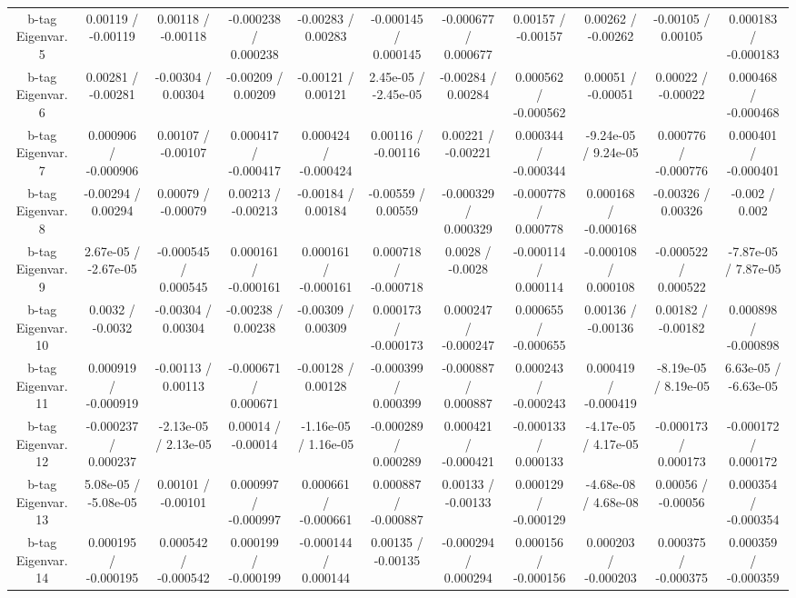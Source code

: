 {\begin{landscape}
\begin{longtable}{@{\extracolsep{\fill}}| *{11}{c|}}
  b-tag Eigenvar. 5 & 0.00119 / -0.00119 & 0.00118 / -0.00118 & -0.000238 / 0.000238 & -0.00283 / 0.00283 & -0.000145 / 0.000145 & -0.000677 / 0.000677 & 0.00157 / -0.00157 & 0.00262 / -0.00262 & -0.00105 / 0.00105 & 0.000183 / -0.000183 \\ 
  b-tag Eigenvar. 6 & 0.00281 / -0.00281 & -0.00304 / 0.00304 & -0.00209 / 0.00209 & -0.00121 / 0.00121 & 2.45e-05 / -2.45e-05 & -0.00284 / 0.00284 & 0.000562 / -0.000562 & 0.00051 / -0.00051 & 0.00022 / -0.00022 & 0.000468 / -0.000468 \\ 
  b-tag Eigenvar. 7 & 0.000906 / -0.000906 & 0.00107 / -0.00107 & 0.000417 / -0.000417 & 0.000424 / -0.000424 & 0.00116 / -0.00116 & 0.00221 / -0.00221 & 0.000344 / -0.000344 & -9.24e-05 / 9.24e-05 & 0.000776 / -0.000776 & 0.000401 / -0.000401 \\ 
  b-tag Eigenvar. 8 & -0.00294 / 0.00294 & 0.00079 / -0.00079 & 0.00213 / -0.00213 & -0.00184 / 0.00184 & -0.00559 / 0.00559 & -0.000329 / 0.000329 & -0.000778 / 0.000778 & 0.000168 / -0.000168 & -0.00326 / 0.00326 & -0.002 / 0.002 \\ 
  b-tag Eigenvar. 9 & 2.67e-05 / -2.67e-05 & -0.000545 / 0.000545 & 0.000161 / -0.000161 & 0.000161 / -0.000161 & 0.000718 / -0.000718 & 0.0028 / -0.0028 & -0.000114 / 0.000114 & -0.000108 / 0.000108 & -0.000522 / 0.000522 & -7.87e-05 / 7.87e-05 \\ 
  b-tag Eigenvar. 10 & 0.0032 / -0.0032 & -0.00304 / 0.00304 & -0.00238 / 0.00238 & -0.00309 / 0.00309 & 0.000173 / -0.000173 & 0.000247 / -0.000247 & 0.000655 / -0.000655 & 0.00136 / -0.00136 & 0.00182 / -0.00182 & 0.000898 / -0.000898 \\ 
  b-tag Eigenvar. 11 & 0.000919 / -0.000919 & -0.00113 / 0.00113 & -0.000671 / 0.000671 & -0.00128 / 0.00128 & -0.000399 / 0.000399 & -0.000887 / 0.000887 & 0.000243 / -0.000243 & 0.000419 / -0.000419 & -8.19e-05 / 8.19e-05 & 6.63e-05 / -6.63e-05 \\ 
  b-tag Eigenvar. 12 & -0.000237 / 0.000237 & -2.13e-05 / 2.13e-05 & 0.00014 / -0.00014 & -1.16e-05 / 1.16e-05 & -0.000289 / 0.000289 & 0.000421 / -0.000421 & -0.000133 / 0.000133 & -4.17e-05 / 4.17e-05 & -0.000173 / 0.000173 & -0.000172 / 0.000172 \\ 
  b-tag Eigenvar. 13 & 5.08e-05 / -5.08e-05 & 0.00101 / -0.00101 & 0.000997 / -0.000997 & 0.000661 / -0.000661 & 0.000887 / -0.000887 & 0.00133 / -0.00133 & 0.000129 / -0.000129 & -4.68e-08 / 4.68e-08 & 0.00056 / -0.00056 & 0.000354 / -0.000354 \\ 
  b-tag Eigenvar. 14 & 0.000195 / -0.000195 & 0.000542 / -0.000542 & 0.000199 / -0.000199 & -0.000144 / 0.000144 & 0.00135 / -0.00135 & -0.000294 / 0.000294 & 0.000156 / -0.000156 & 0.000203 / -0.000203 & 0.000375 / -0.000375 & 0.000359 / -0.000359 \\ 

\end{longtable}
\end{landscape}}
